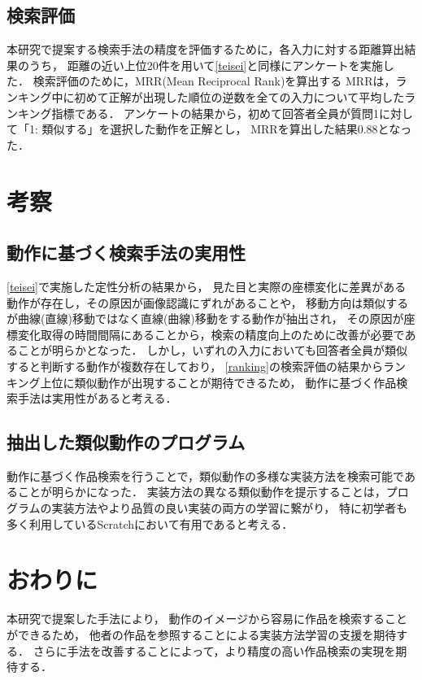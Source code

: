 \documentclass[twocolumn]{jarticle} %
\begin{document}
\subsection{検索評価}
本研究で提案する検索手法の精度を評価するために，各入力に対する距離算出結果のうち，
距離の近い上位20件を用いて\ref{teisei}と同様にアンケートを実施した．
検索評価のために，MRR(Mean Reciprocal Rank)を算出する
MRRは，ランキング中に初めて正解が出現した順位の逆数を全ての入力について平均したランキング指標である．
アンケートの結果から，初めて回答者全員が質問1に対して「1: 類似する」を選択した動作を正解とし，
MRRを算出した結果0.88となった．

\section{考察}
\subsection{動作に基づく検索手法の実用性}
\ref{teisei}で実施した定性分析の結果から，
見た目と実際の座標変化に差異がある動作が存在し，その原因が画像認識にずれがあることや，
移動方向は類似するが曲線(直線)移動ではなく直線(曲線)移動をする動作が抽出され，
その原因が座標変化取得の時間間隔にあることから，検索の精度向上のために改善が必要であることが明らかとなった．
しかし，いずれの入力においても回答者全員が類似すると判断する動作が複数存在しており，
\ref{ranking}の検索評価の結果からランキング上位に類似動作が出現することが期待できるため，
動作に基づく作品検索手法は実用性があると考える．

\subsection{抽出した類似動作のプログラム}
動作に基づく作品検索を行うことで，類似動作の多様な実装方法を検索可能であることが明らかになった．
実装方法の異なる類似動作を提示することは，プログラムの実装方法やより品質の良い実装の両方の学習に繋がり，
特に初学者も多く利用しているScratchにおいて有用であると考える．

\section{おわりに}
本研究で提案した手法により，
動作のイメージから容易に作品を検索することができるため，
他者の作品を参照することによる実装方法学習の支援を期待する．
さらに手法を改善することによって，より精度の高い作品検索の実現を期待する．


\end{document}
